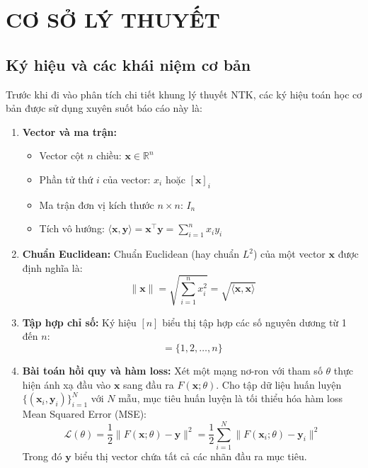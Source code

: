 \chapter{CƠ SỞ LÝ THUYẾT}

\section{Ký hiệu và các khái niệm cơ bản}

Trước khi đi vào phân tích chi tiết khung lý thuyết NTK, các ký hiệu toán học cơ bản được sử dụng xuyên suốt báo cáo này là:

\begin{enumerate}
    \item \textbf{Vector và ma trận:}
    \begin{itemize}
        \item Vector cột $n$ chiều: $\mathbf{x} \in \mathbb{R}^n$
        \item Phần tử thứ $i$ của vector: $x_i$ hoặc $[\mathbf{x}]_i$
        \item Ma trận đơn vị kích thước $n \times n$: $I_n$
        \item Tích vô hướng: $\langle \mathbf{x}, \mathbf{y} \rangle = \mathbf{x}^\top \mathbf{y} = \sum_{i=1}^{n} x_i y_i$
    \end{itemize}
    
    \item \textbf{Chuẩn Euclidean:} Chuẩn Euclidean (hay chuẩn $L^2$) của một vector $\mathbf{x}$ được định nghĩa là:
    \begin{equation}
        \|\mathbf{x}\| = \sqrt{\sum_{i=1}^{n} x_i^2} = \sqrt{\langle \mathbf{x}, \mathbf{x} \rangle}
    \end{equation}
    
    \item \textbf{Tập hợp chỉ số:} Ký hiệu $[n]$ biểu thị tập hợp các số nguyên dương từ 1 đến $n$:
    \begin{equation}
        [n] = \{1, 2, \ldots, n\}
    \end{equation}
    
    \item \textbf{Bài toán hồi quy và hàm loss:} Xét một mạng nơ-ron với tham số $\theta$ thực hiện ánh xạ đầu vào $\mathbf{x}$ sang đầu ra $F(\mathbf{x}; \theta)$. Cho tập dữ liệu huấn luyện $\{(\mathbf{x}_i, \mathbf{y}_i)\}_{i=1}^{N}$ với $N$ mẫu, mục tiêu huấn luyện là tối thiểu hóa hàm loss Mean Squared Error (MSE):
    \begin{equation}
        \mathcal{L}(\theta) = \frac{1}{2} \|F(\mathbf{x}; \theta) - \mathbf{y}\|^2 = \frac{1}{2} \sum_{i=1}^{N} \|F(\mathbf{x}_i; \theta) - \mathbf{y}_i\|^2
    \end{equation}
    Trong đó $\mathbf{y}$ biểu thị vector chứa tất cả các nhãn đầu ra mục tiêu.
    

\end{enumerate}
